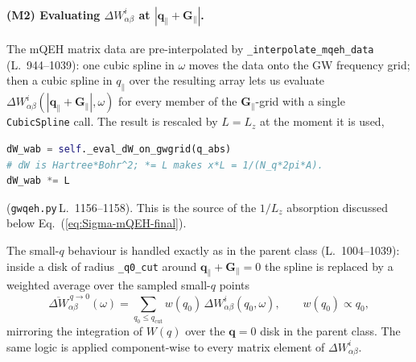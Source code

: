 \documentclass[11pt,a4paper]{article}
\newcommand{\qq}{\mathbf{q}}
\newcommand{\Gpar}{\mathbf{G}_{\!\parallel}}
\newcommand{\qpar}{\mathbf{q}_{\parallel}}
\newcommand{\eq}[1]{Eq.~(\ref{eq:#1})}
\begin{document}
\paragraph{(M2) Evaluating $\Delta W^i_{\alpha\beta}$ at
$|\qpar+\Gpar|$.}  The mQEH matrix data are pre-interpolated by
\texttt{\_interpolate\_mqeh\_data} (L.~944--1039): one cubic spline
in $\omega$ moves the data onto the GW frequency grid; then a cubic
spline in $q_\parallel$ over the resulting array lets us evaluate
$\Delta W^i_{\alpha\beta}(|\qpar+\Gpar|,\omega)$ for every member of
the $\Gpar$-grid with a single \texttt{CubicSpline} call.  The result
is rescaled by $L = L_z$ at the moment it is used,
\begin{lstlisting}[language=Python]
dW_wab = self._eval_dW_on_gwgrid(q_abs)
# dW is Hartree*Bohr^2; *= L makes x*L = 1/(N_q*2pi*A).
dW_wab *= L
\end{lstlisting}
(\texttt{gwqeh.py}\,L.~1156--1158).  This is the source of the
$1/L_z$ absorption discussed below \eq{Sigma-mQEH-final}.

The small-$q$ behaviour is handled exactly as in the parent class
(L.~1004--1039): inside a disk of radius
\texttt{\_q0\_cut} around $\qpar+\Gpar=0$ the spline is replaced by a
weighted average over the sampled small-$q$ points
\begin{equation}
\overline{\Delta W}^{\,q\to 0}_{\alpha\beta}(\omega) =
\sum_{q_0\le q_\text{cut}} w(q_0)\, \Delta W^i_{\alpha\beta}(q_0,\omega),
\qquad
w(q_0) \propto q_0,
\label{eq:q0-average}
\end{equation}
mirroring the integration of $W(q)$ over the $\qq=0$ disk in the
parent class.  The same logic is applied component-wise to every
matrix element of $\Delta W^i_{\alpha\beta}$.
\end{document}
